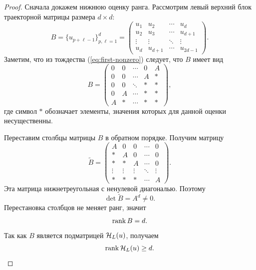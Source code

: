 \begin{proof}
Сначала докажем нижнюю оценку ранга. Рассмотрим левый верхний блок траекторной матрицы размера $d\times d$:
\begin{equation*}
    B
    =
    \{u_{p+\ell-1}\}_{p,\ell=1}^{d}
    =
    \begin{pmatrix}
        u_1 & u_2 & \cdots & u_d \\
        u_2 & u_3 & \cdots & u_{d+1} \\
        \vdots & \vdots & \ddots & \vdots \\
        u_d & u_{d+1} & \cdots & u_{2d-1}
    \end{pmatrix}.
\end{equation*}
Заметим, что из тождества (\ref{eq:first-nonzero}) следует, что $B$ имеет вид
\begin{equation*}
    B=
    \begin{pmatrix}
        0 & 0 & \cdots & 0 & A \\
        0 & 0 & \cdots & A & * \\
        0 & 0 & \ddots & * & * \\
        0 & A & \cdots & * & * \\
        A & * & \cdots & * & *
    \end{pmatrix},
\end{equation*}
где символ $*$ обозначает элементы, значения которых для данной оценки несущественны.

Переставим столбцы матрицы $B$ в обратном порядке. Получим матрицу
\begin{equation*}
    \widetilde B=
    \begin{pmatrix}
        A & 0 & 0 & \cdots & 0 \\
        * & A & 0 & \cdots & 0 \\
        * & * & A & \cdots & 0 \\
        \vdots & \vdots & \vdots & \ddots & \vdots \\
        * & * & * & \cdots & A
    \end{pmatrix}.
\end{equation*}
Эта матрица нижнетреугольная с ненулевой диагональю. Поэтому
\begin{equation*}
    \det \widetilde B=A^d\ne0.
\end{equation*}
Перестановка столбцов не меняет ранг, значит
\begin{equation*}
    \operatorname{rank} B=d.
\end{equation*}
Так как $B$ является подматрицей $\mathcal H_L(u)$, получаем
\begin{equation*}
    \operatorname{rank} \mathcal H_L(u)\ge d.
\end{equation*}


\end{proof}
